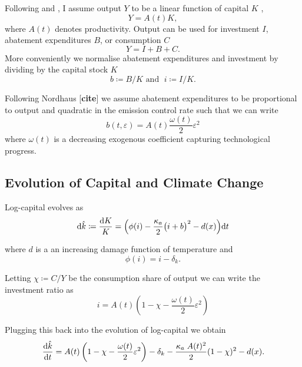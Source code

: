\documentclass[../../main.tex]{subfiles}
\begin{document}
Following  and \cite{hambel_optimal_2021}, I assume output $Y$ to be a linear function of capital $K$ , \begin{equation}
Y =  A(t) K,
\end{equation} where $A(t)$ denotes productivity. Output can be used for investment $I$, abatement expenditures $B$, or consumption $C$ \begin{equation}
    Y = I + B + C.
\end{equation} More conveniently we normalise abatement expenditures and investment by dividing by the capital stock $K$ \begin{equation}
    b \coloneqq B / K \text{ and } \; i \coloneqq I / K.
\end{equation}

Following Nordhaus [\textbf{cite}] we assume abatement expenditures to be proportional to output and quadratic in the emission control rate such that we can write \begin{equation}
    b(t, \varepsilon) = A(t) \frac{\omega(t)}{2} \varepsilon^2
\end{equation} where $\omega(t)$ is a decreasing exogenous coefficient capturing technological progress.

\subsection{Evolution of Capital and Climate Change}

Log-capital evolves as \begin{equation}
    \text{d} \hat{k} \coloneq \frac{\text{d} K}{K} = \Big( \phi(i) - \frac{\kappa_a}{2} \big(i + b\big)^2 - d(x) \Big) \text{d} t
\end{equation}

where $d$ is a an increasing damage function of temperature and \begin{equation}
    \phi(i) = i - \delta_k.
\end{equation}

Letting $\chi \coloneqq C / Y$ be the consumption share of output we can write the investment ratio as \begin{equation}
    i = A(t) \left(1 - \chi - \frac{\omega(t)}{2} \varepsilon^2\right)
\end{equation}

Plugging this back into the evolution of log-capital we obtain \begin{equation}
    \frac{\text{d} \hat k}{\text{d} t} = A(t) \left(1 - \chi - \frac{\omega(t)}{2} \varepsilon^2\right) - \delta_k - \frac{\kappa_a \; A(t)^2}{2} (1 - \chi)^2 - d(x).
\end{equation} 
\end{document}
